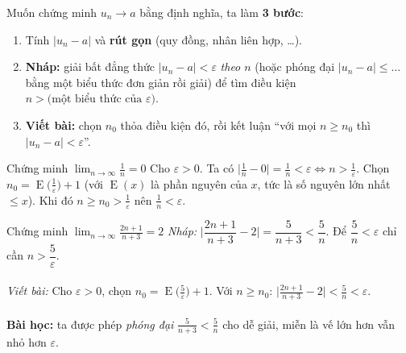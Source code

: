 \documentclass[11pt, a4paper, twoside]{article}
\newcommand{\eps}{\varepsilon}
\newcommand{\limn}{\lim_{n\to\infty}}
\newcommand{\EE}{\operatorname{E}}
\begin{document}
Muốn chứng minh $u_n\to a$ bằng định nghĩa, ta làm \textbf{3 bước}:
\begin{enumerate}[label=\textbf{Bước \arabic*.}, leftmargin=*, itemsep=2pt, topsep=2pt]
  \item Tính $|u_n-a|$ và \textbf{rút gọn} (quy đồng, nhân liên hợp, \dots).
  \item \textbf{Nháp:} giải bất đẳng thức $|u_n-a|<\eps$ \emph{theo $n$} (hoặc phóng đại $|u_n-a|\le\dots$ bằng một biểu thức đơn giản rồi giải) để tìm điều kiện $n>\text{(một biểu thức của }\eps)$.
  \item \textbf{Viết bài:} chọn $n_0$ thỏa điều kiện đó, rồi kết luận ``với mọi $n\ge n_0$ thì $|u_n-a|<\eps$''.
\end{enumerate}
\vspace{0.3cm}
\begin{vd}{Chứng minh $\displaystyle\limn\frac1n=0$}
Cho $\eps>0$. Ta có $\big|\frac1n-0\big|=\frac1n<\eps\iff n>\frac1\eps$. Chọn $n_0=\EE\big(\frac1\eps\big)+1$ (với $\EE(x)$ là phần nguyên của $x$, tức là số nguyên lớn nhất $\le x$). Khi đó $n\ge n_0>\frac1\eps$ nên $\frac1n<\eps$.
\end{vd}

\begin{vd}{Chứng minh $\displaystyle\limn\frac{2n+1}{n+3}=2$}
\emph{Nháp:} $\Big|\dfrac{2n+1}{n+3}-2\Big|=\dfrac{5}{n+3}<\dfrac5n$. Để $\dfrac5n<\eps$ chỉ cần $n>\dfrac5\eps$.\\\\
\emph{Viết bài:} Cho $\eps>0$, chọn $n_0=\EE\big(\frac5\eps\big)+1$. Với $n\ge n_0$: $\big|\frac{2n+1}{n+3}-2\big|<\frac5n<\eps$. \\\\
\textbf{Bài học:} ta được phép \emph{phóng đại} $\frac5{n+3}<\frac5n$ cho dễ giải, miễn là vế lớn hơn vẫn nhỏ hơn $\eps$.
\end{vd}
\vspace{0.3cm}
\end{document}

